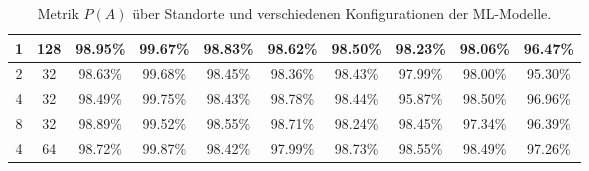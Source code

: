 \begin{table}[h!]
\begin{tabular}{ | c | c | c | c | c | c | c | c | c | c | }
        1 & 128 & 98.95\% & 99.67\% & 98.83\% & 98.62\% & 98.50\% & 98.23\% & 98.06\% & 96.47\% \\\hline
        2 & 32 & 98.63\% & 99.68\% & 98.45\% & 98.36\% & 98.43\% & 97.99\% & 98.00\% & 95.30\% \\\hline
        4 & 32 & 98.49\% & 99.75\% & 98.43\% & 98.78\% & 98.44\% & 95.87\% & 98.50\% & 96.96\% \\\hline
        8 & 32 & 98.89\% & 99.52\% & 98.55\% & 98.71\% & 98.24\% & 98.45\% & 97.34\% & 96.39\% \\\hline
        4 & 64 & 98.72\% & 99.87\% & 98.42\% & 97.99\% & 98.73\% & 98.55\% & 98.49\% & 97.26\% \\\hline
    \end{tabular}
    \caption{Metrik $P(A)$ über Standorte und verschiedenen Konfigurationen der ML-Modelle.}
    \label{tab:predictions_by_acc}
\end{table}
